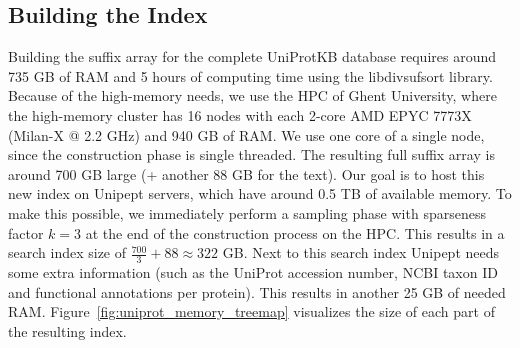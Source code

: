 \documentclass[11pt]{article}
\newenvironment{Figure}
{\par\medskip\noindent\minipage{\linewidth}}
{\endminipage\par\medskip}
\begin{document}
\begin{multicols}{2}
        \subsection{Building the Index}
        Building the suffix array for the complete UniProtKB database requires around 735 GB of RAM and 5 hours of computing time using the libdivsufsort library.
        Because of the high-memory needs, we use the HPC of Ghent University, where the high-memory cluster has 16 nodes with each 2-core AMD EPYC 7773X (Milan-X @ 2.2 GHz) and 940 GB of RAM\@.
        We use one core of a single node, since the construction phase is single threaded.
        The resulting full suffix array is around 700 GB large (+ another 88 GB for the text).
        Our goal is to host this new index on Unipept servers, which have around 0.5 TB of available memory.
        To make this possible, we immediately perform a sampling phase with sparseness factor $k = 3$ at the end of the construction process on the HPC\@.
        This results in a search index size of $\frac{700}{3} + 88 \approx 322$ GB\@.
        Next to this search index Unipept needs some extra information (such as the UniProt accession number, NCBI taxon ID and functional annotations per protein).
        This results in another 25 GB of needed RAM\@.
        Figure~\ref{fig:uniprot_memory_treemap} visualizes the size of each part of the resulting index.

        \begin{Figure}
            \centering
            \label{fig:uniprot_memory_treemap}
        \end{Figure}


\end{multicols}
\end{document}
